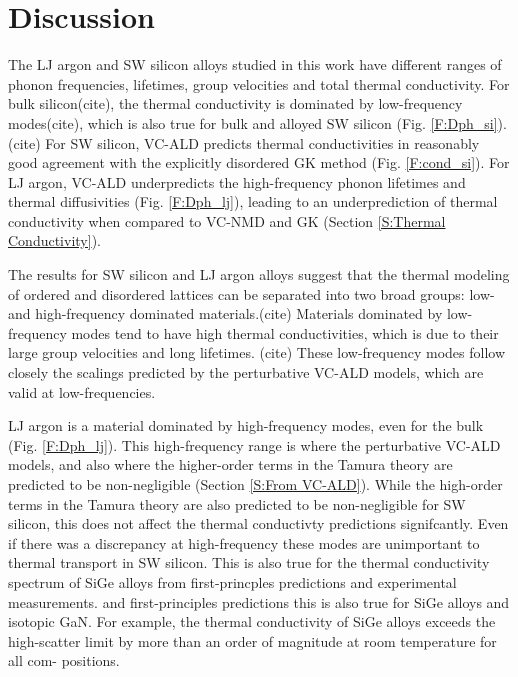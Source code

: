 \documentclass[aps,prb,twocolumn,superscriptaddress,amsmath,amssymb,floatfix]{revtex4}
\begin{document}
\section{\label{S:Discussion}Discussion}

The LJ argon and SW silicon alloys studied in this work 
have different ranges of phonon frequencies, 
lifetimes, group velocities and total thermal conductivity. 
For bulk silicon(cite), the thermal conductivity 
is dominated by low-frequency modes(cite), which is also true for 
bulk and alloyed SW silicon (Fig. \ref{F:Dph_si}).(cite) For SW silicon, 
VC-ALD predicts thermal conductivities in reasonably 
good agreement with the 
explicitly disordered GK method (Fig. \ref{F:cond_si}).  
For LJ argon, VC-ALD underpredicts 
the high-frequency phonon lifetimes and thermal diffusivities 
(Fig. \ref{F:Dph_lj}), 
leading to an underprediction of 
thermal conductivity when compared to VC-NMD and GK 
(Section \ref{S:Thermal Conductivity}). 

The results for SW silicon and LJ argon alloys suggest that 
the thermal modeling of ordered and 
disordered lattices can be separated into two broad groups: 
low- and high-frequency dominated materials.(cite) Materials dominated 
by low-frequency modes tend to have high thermal conductivities, 
which is due to their large group velocities and long lifetimes.
(cite) These low-frequency modes  
follow closely the scalings predicted by the perturbative VC-ALD 
models, which are valid at low-frequencies. 

LJ argon is a material 
dominated by high-frequency modes, even for the bulk 
(Fig. \ref{F:Dph_lj}). 
This high-frequency range is where the perturbative VC-ALD models, 
and also where the higher-order 
terms in the Tamura theory are predicted to be non-negligible 
(Section \ref{S:From VC-ALD}). 
While the 
high-order terms in the Tamura theory are also predicted to be 
non-negligible for SW silicon, this does not affect the thermal 
conductivty predictions signifcantly. Even if there was a discrepancy 
at high-frequency these modes 
are unimportant to thermal transport in SW silicon. This is also 
true for the thermal conductivity spectrum of SiGe alloys 
from first-princples predictions\cite{garg_role_2011} and experimental 
measurements.\cite{abeles_thermal_1962,cahill_thermal_2004,
cahill_thermal_2005,cheaito_experimental_2012} 
and first-principles predictions\cite{garg_role_2011,lindsay_thermal_2012} 
this is also true for SiGe alloys and isotopic GaN.
\cite{} 
For example, the thermal conductivity of SiGe alloys
exceeds the high-scatter limit by more than
an order of magnitude at room temperature for all com-
positions.
\end{document}
